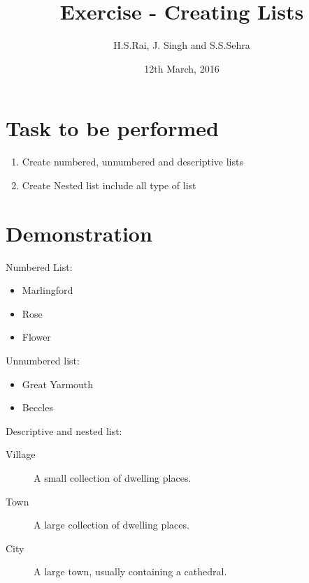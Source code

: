 \documentclass[12pt]{article}
\title{Exercise  - Creating Lists }
\author{H.S.Rai, J. Singh and S.S.Sehra}
\date{12th March, 2016}
\begin{document}
	\maketitle
	\section*{Task to be performed}
	\begin{enumerate}
		\item Create numbered, unnumbered and descriptive lists
		\item Create Nested list include all type of list
	\end{enumerate}
\section*{Demonstration}	
Numbered List:
	
\begin{itemize}

	   	
\item Marlingford
   	
\item Rose
\item Flower
	   	
\end{itemize}

Unnumbered list:
\begin{itemize}
\item Great Yarmouth
\item Beccles
\end{itemize}

Descriptive and nested list:
\begin{description}

  \item[Village] A small collection of dwelling places. 
   \item[Town] A large collection of dwelling places.    
  \item[City] A large town, usually containing a cathedral.  
\end{description}
\end{document}
